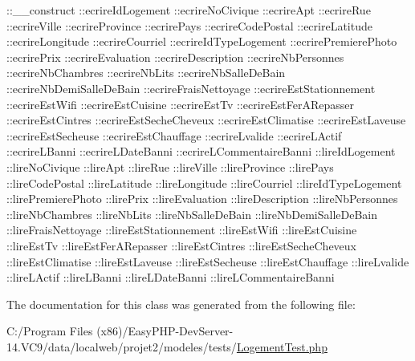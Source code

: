\+::\+\_\+\+\_\+construct  \+::ecrire\+Id\+Logement  \+::ecrire\+No\+Civique  \+::ecrire\+Apt  \+::ecrire\+Rue  \+::ecrire\+Ville  \+::ecrire\+Province  \+::ecrire\+Pays  \+::ecrire\+Code\+Postal  \+::ecrire\+Latitude  \+::ecrire\+Longitude  \+::ecrire\+Courriel  \+::ecrire\+Id\+Type\+Logement  \+::ecrire\+Premiere\+Photo  \+::ecrire\+Prix  \+::ecrire\+Evaluation  \+::ecrire\+Description  \+::ecrire\+Nb\+Personnes  \+::ecrire\+Nb\+Chambres  \+::ecrire\+Nb\+Lits  \+::ecrire\+Nb\+Salle\+De\+Bain  \+::ecrire\+Nb\+Demi\+Salle\+De\+Bain  \+::ecrire\+Frais\+Nettoyage  \+::ecrire\+Est\+Stationnement  \+::ecrire\+Est\+Wifi  \+::ecrire\+Est\+Cuisine  \+::ecrire\+Est\+Tv  \+::ecrire\+Est\+Fer\+A\+Repasser  \+::ecrire\+Est\+Cintres  \+::ecrire\+Est\+Seche\+Cheveux  \+::ecrire\+Est\+Climatise  \+::ecrire\+Est\+Laveuse  \+::ecrire\+Est\+Secheuse  \+::ecrire\+Est\+Chauffage  \+::ecrire\+Lvalide  \+::ecrire\+L\+Actif  \+::ecrire\+L\+Banni  \+::ecrire\+L\+Date\+Banni  \+::ecrire\+L\+Commentaire\+Banni  \+::lire\+Id\+Logement  \+::lire\+No\+Civique  \+::lire\+Apt  \+::lire\+Rue  \+::lire\+Ville  \+::lire\+Province  \+::lire\+Pays  \+::lire\+Code\+Postal  \+::lire\+Latitude  \+::lire\+Longitude  \+::lire\+Courriel  \+::lire\+Id\+Type\+Logement  \+::lire\+Premiere\+Photo  \+::lire\+Prix  \+::lire\+Evaluation  \+::lire\+Description  \+::lire\+Nb\+Personnes  \+::lire\+Nb\+Chambres  \+::lire\+Nb\+Lits  \+::lire\+Nb\+Salle\+De\+Bain  \+::lire\+Nb\+Demi\+Salle\+De\+Bain  \+::lire\+Frais\+Nettoyage  \+::lire\+Est\+Stationnement  \+::lire\+Est\+Wifi  \+::lire\+Est\+Cuisine  \+::lire\+Est\+Tv  \+::lire\+Est\+Fer\+A\+Repasser  \+::lire\+Est\+Cintres  \+::lire\+Est\+Seche\+Cheveux  \+::lire\+Est\+Climatise  \+::lire\+Est\+Laveuse  \+::lire\+Est\+Secheuse  \+::lire\+Est\+Chauffage  \+::lire\+Lvalide  \+::lire\+L\+Actif  \+::lire\+L\+Banni  \+::lire\+L\+Date\+Banni  \+::lire\+L\+Commentaire\+Banni 

The documentation for this class was generated from the following file\+:\begin{DoxyCompactItemize}
\item 
C\+:/\+Program Files (x86)/\+Easy\+P\+H\+P-\/\+Dev\+Server-\/14.\+V\+C9/data/localweb/projet2/modeles/tests/\hyperlink{_logement_test_8php}{Logement\+Test.\+php}\end{DoxyCompactItemize}

